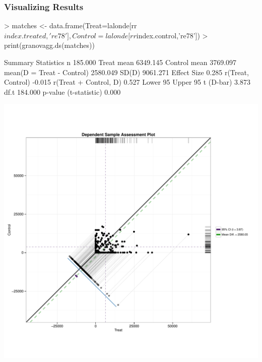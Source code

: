 \documentclass[10pt,slidestop,mathserif,c]{beamer}
\begin{document}
\begin{frame}
    \frametitle{Visualizing Results}
\begin{Schunk}
\begin{Sinput}
> matches <- data.frame(Treat=lalonde[rr$index.treated,'re78'], 
   Control=lalonde[rr$index.control,'re78'])
> print(granovagg.ds(matches))
\end{Sinput}
\begin{Soutput}
                              Summary Statistics
n                                        185.000
Treat mean                              6349.145
Control mean                            3769.097
mean(D = Treat - Control)               2580.049
SD(D)                                   9061.271
Effect Size                                0.285
r(Treat, Control)                         -0.015
r(Treat + Control, D)                      0.527
Lower 95%
Upper 95%
t (D-bar)                                  3.873
df.t                                     184.000
p-value (t-statistic)                      0.000
\end{Soutput}
\end{Schunk}
\end{frame}

\begin{frame}
    \begin{center}
        \includegraphics{figures/Slides-granovaggds}
    \end{center}
\end{frame}
\end{document}
